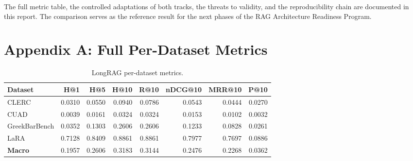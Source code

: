 \documentclass[11pt,a4paper]{article}
\begin{document}
The full metric table, the controlled adaptations of both tracks,
the threats to validity, and the reproducibility chain are documented
in this report. The comparison serves as the reference result for
the next phases of the RAG Architecture Readiness Program.

\appendix

\section{Appendix A: Full Per-Dataset Metrics}

\begin{table}[h]
\centering
\caption{LongRAG per-dataset metrics.}
\small
\begin{tabular}{l r r r r r r r}
\toprule
\textbf{Dataset} & \textbf{H@1} & \textbf{H@5} & \textbf{H@10}
  & \textbf{R@10} & \textbf{nDCG@10} & \textbf{MRR@10} & \textbf{P@10} \\
\midrule
CLERC              & \num{0.0310} & \num{0.0550} & \num{0.0940}
                   & \num{0.0786} & \num{0.0543} & \num{0.0444} & \num{0.0270} \\
CUAD               & \num{0.0039} & \num{0.0161} & \num{0.0324}
                   & \num{0.0324} & \num{0.0153} & \num{0.0102} & \num{0.0032} \\
GreekBarBench      & \num{0.0352} & \num{0.1303} & \num{0.2606}
                   & \num{0.2606} & \num{0.1233} & \num{0.0828} & \num{0.0261} \\
LaRA               & \num{0.7128} & \num{0.8409} & \num{0.8861}
                   & \num{0.8861} & \num{0.7977} & \num{0.7697} & \num{0.0886} \\
\midrule
\textbf{Macro}     & \num{0.1957} & \num{0.2606} & \num{0.3183}
                   & \num{0.3144} & \num{0.2476} & \num{0.2268} & \num{0.0362} \\
\bottomrule
\end{tabular}
\end{table}
\end{document}
